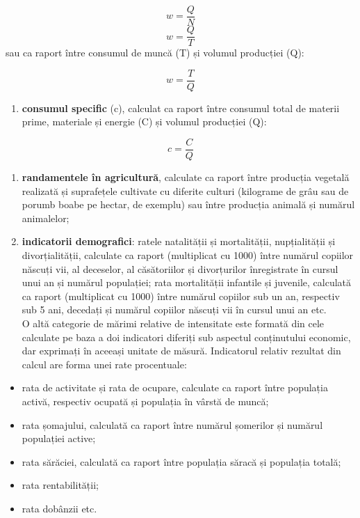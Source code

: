\documentclass[
  11pt,
  b5paper,
  nottoc]{book}
\providecommand{\tightlist}{%
  \setlength{\itemsep}{0pt}\setlength{\parskip}{0pt}}\usepackage{longtable,booktabs,array}
\begin{document}
\[w = \frac{Q}{N}\] \[w = \frac{Q}{T}\] sau ca raport între consumul de
muncă (T) și volumul producției (Q):

\[w = \frac{T}{Q}\]

\begin{enumerate}
\def\labelenumi{\alph{enumi})}
\setcounter{enumi}{1}
\tightlist
\item
  \textbf{consumul specific} (c), calculat ca raport între consumul
  total de materii prime, materiale și energie (C) și volumul producției
  (Q):
\end{enumerate}

\[c = \frac{C}{Q}\]

\begin{enumerate}
\def\labelenumi{\alph{enumi})}
\setcounter{enumi}{2}
\tightlist
\item
  \textbf{randamentele în agricultură}, calculate ca raport între
  producția vegetală realizată și suprafețele cultivate cu diferite
  culturi (kilograme de grâu sau de porumb boabe pe hectar, de exemplu)
  sau între producția animală și numărul animalelor;\\
\item
  \textbf{indicatorii demografici}: ratele natalității și mortalității,
  nupțialității și divorțialității, calculate ca raport (multiplicat cu
  1000) între numărul copiilor născuți vii, al deceselor, al
  căsătoriilor și divorțurilor înregistrate în cursul unui an și numărul
  populației; rata mortalității infantile și juvenile, calculată ca
  raport (multiplicat cu 1000) între numărul copiilor sub un an,
  respectiv sub 5 ani, decedați și numărul copiilor născuți vii în
  cursul unui an etc.\\
  O altă categorie de mărimi relative de intensitate este formată din
  cele calculate pe baza a doi indicatori diferiți sub aspectul
  conținutului economic, dar exprimați în aceeași unitate de măsură.
  Indicatorul relativ rezultat din calcul are forma unei rate
  procentuale:\\
\end{enumerate}

\begin{itemize}
\tightlist
\item
  rata de activitate și rata de ocupare, calculate ca raport între
  populația activă, respectiv ocupată și populația în vârstă de muncă;\\
\item
  rata șomajului, calculată ca raport între numărul șomerilor și numărul
  populației active;\\
\item
  rata sărăciei, calculată ca raport între populația săracă și populația
  totală;\\
\item
  rata rentabilității;\\
\item
  rata dobânzii etc.
\end{itemize}
\end{document}
